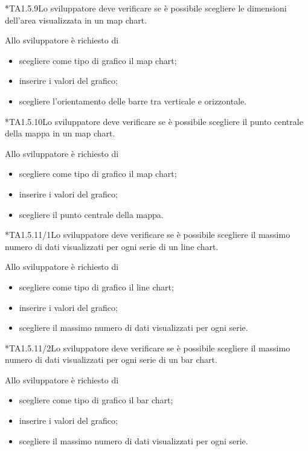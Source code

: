 	*{TA1.5.9}Lo sviluppatore deve verificare se è possibile scegliere le dimensioni dell'area visualizzata in un map chart.

		Allo sviluppatore è richiesto di
		\begin{itemize}
			\item scegliere come tipo di grafico il map chart;
			\item inserire i valori del grafico;
			\item scegliere l'orientamento delle barre tra verticale e orizzontale.
		\end{itemize}

	*{TA1.5.10}Lo sviluppatore deve verificare se è possibile scegliere il punto centrale della mappa in un map chart.

		Allo sviluppatore è richiesto di
		\begin{itemize}
			\item scegliere come tipo di grafico il map chart;
			\item inserire i valori del grafico;
			\item scegliere il punto centrale della mappa.
		\end{itemize}

	*{TA1.5.11/1}Lo sviluppatore deve verificare se è possibile scegliere il massimo numero di dati visualizzati per ogni serie di un line chart.

		Allo sviluppatore è richiesto di
		\begin{itemize}
			\item scegliere come tipo di grafico il line chart;
			\item inserire i valori del grafico;
			\item scegliere il massimo numero di dati visualizzati per ogni serie.
		\end{itemize}

	*{TA1.5.11/2}Lo sviluppatore deve verificare se è possibile scegliere il massimo numero di dati visualizzati per ogni serie di un bar chart.

		Allo sviluppatore è richiesto di
		\begin{itemize}
			\item scegliere come tipo di grafico il bar chart;
			\item inserire i valori del grafico;
			\item scegliere il massimo numero di dati visualizzati per ogni serie.
		\end{itemize}

